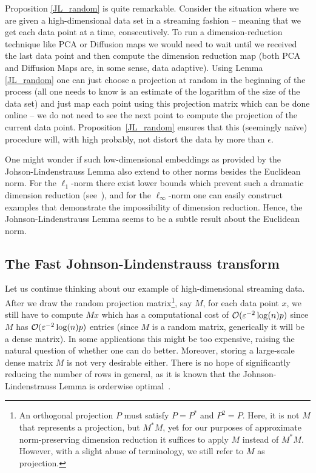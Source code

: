 Proposition \ref{JL_random} is quite remarkable. Consider the situation where we are given a high-dimensional data set in a streaming fashion -- meaning that we get each data point at a time, consecutively. To run a dimension-reduction technique like PCA or Diffusion maps we would need to wait until we received the last data point and then compute the dimension reduction map (both PCA and Diffusion Maps are, in some sense, data adaptive). Using Lemma \ref{JL_random} one can just choose a projection at random in the beginning of the process (all one needs to know is an estimate of the logarithm of the size of the data set) and just map each point using this projection matrix which  can be done online -- we do not need to see the next point to compute the projection of the current data point. Proposition~\ref{JL_random} ensures that this (seemingly na\"ive) procedure will, with high probably, not distort the data by more than $\epsilon$.




One might wonder if such low-dimensional embeddings as provided by the Johson-Lindenstrauss Lemma also extend to other norms besides the Euclidean norm.  For the $\ell_1$-norm there exist lower bounds which prevent such a dramatic dimension reduction (see~\cite{lee2004embedding}), and for the $\ell_{\infty}$-norm one can easily construct examples that demonstrate the impossibility of dimension reduction. Hence, the Johnson-Lindenstrauss Lemma seems to be a subtle result about the Euclidean norm.




\subsection{The Fast Johnson-Lindenstrauss transform}

Let us continue thinking about our example of high-dimensional streaming data. After we draw the random projection matrix\footnote{An orthogonal projection $P$ must satisfy $P=P^{\ast}$ and $P^2=P$. Here, it is not $M$ that represents a projection, but $M^{\ast} M$, yet for our purposes of approximate norm-preserving dimension reduction it suffices to apply $M$ instead of $M^{\ast} M$.  However, with a slight abuse of terminology, we still refer to $M$ as projection.}, say $M$, for each data point $x$, we still have to compute $Mx$ which has a computational cost of $\mathcal{O}(\varepsilon^{-2}\log(n)p)$  since $M$ has $\mathcal{O}(\varepsilon^{-2}\log(n)p)$ entries (since $M$ is a random matrix, generically it will be a dense matrix).  In some applications this might be too expensive, raising the natural question of whether one can do better. 
Moreover, storing a large-scale dense matrix $M$  is not very desirable either.
There is no hope of significantly reducing the number of rows in general, as it is known that  the Johnson-Lindenstrauss Lemma is orderwise optimal~\cite{Alon_JL_lowerbound_2003,Larsen_Nelson_JL}. 


